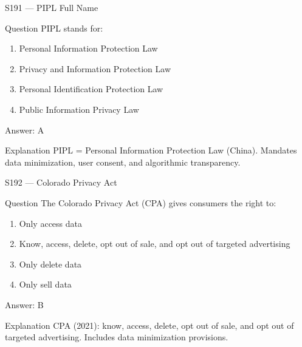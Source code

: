 \documentclass[aspectratio=169,8pt]{beamer}
\begin{document}
	\begin{frame}{S191 --- PIPL Full Name}
		\begin{block}{Question}
			PIPL stands for:
			\begin{enumerate}
				\item Personal Information Protection Law
				\item Privacy and Information Protection Law
				\item Personal Identification Protection Law
				\item Public Information Privacy Law
			\end{enumerate}
		\end{block}
		\begin{exampleblock}{Answer: A}\end{exampleblock}
		\begin{block}{Explanation}
			PIPL = Personal Information Protection Law (China). Mandates data minimization, user consent, and algorithmic transparency.
		\end{block}
	\end{frame}
	
	\begin{frame}{S192 --- Colorado Privacy Act}
		\begin{block}{Question}
			The Colorado Privacy Act (CPA) gives consumers the right to:
			\begin{enumerate}
				\item Only access data
				\item Know, access, delete, opt out of sale, and opt out of targeted advertising
				\item Only delete data
				\item Only sell data
			\end{enumerate}
		\end{block}
		\begin{exampleblock}{Answer: B}\end{exampleblock}
		\begin{block}{Explanation}
			CPA (2021): know, access, delete, opt out of sale, and opt out of targeted advertising. Includes data minimization provisions.
		\end{block}
	\end{frame}
	
\end{document}
